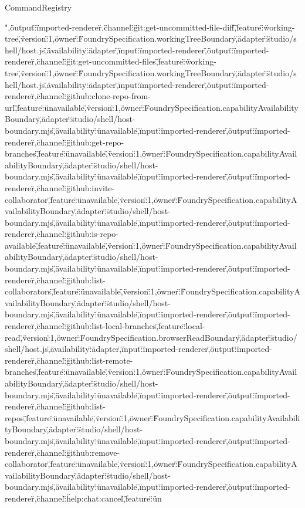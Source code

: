 \begin{lexlean}{CommandRegistry}
\begin{semanticmodule}
{",\"output\":\"imported-renderer\"},{\"channel\":\"git:get-uncommitted-file-diff\",\"feature\":\"working-tree\",\"version\":1,\"owner\":\"FoundrySpecification.workingTreeBoundary\",\"adapter\":\"studio/shell/host.js\",\"availability\":\"adapter\",\"input\":\"imported-renderer\",\"output\":\"imported-renderer\"},{\"channel\":\"git:get-uncommitted-files\",\"feature\":\"working-tree\",\"version\":1,\"owner\":\"FoundrySpecification.workingTreeBoundary\",\"adapter\":\"studio/shell/host.js\",\"availability\":\"adapter\",\"input\":\"imported-renderer\",\"output\":\"imported-renderer\"},{\"channel\":\"github:clone-repo-from-url\",\"feature\":\"unavailable\",\"version\":1,\"owner\":\"FoundrySpecification.capabilityAvailabilityBoundary\",\"adapter\":\"studio/shell/host-boundary.mjs\",\"availability\":\"unavailable\",\"input\":\"imported-renderer\",\"output\":\"imported-renderer\"},{\"channel\":\"github:get-repo-branches\",\"feature\":\"unavailable\",\"version\":1,\"owner\":\"FoundrySpecification.capabilityAvailabilityBoundary\",\"adapter\":\"studio/shell/host-boundary.mjs\",\"availability\":\"unavailable\",\"input\":\"imported-renderer\",\"output\":\"imported-renderer\"},{\"channel\":\"github:invite-collaborator\",\"feature\":\"unavailable\",\"version\":1,\"owner\":\"FoundrySpecification.capabilityAvailabilityBoundary\",\"adapter\":\"studio/shell/host-boundary.mjs\",\"availability\":\"unavailable\",\"input\":\"imported-renderer\",\"output\":\"imported-renderer\"},{\"channel\":\"github:is-repo-available\",\"feature\":\"unavailable\",\"version\":1,\"owner\":\"FoundrySpecification.capabilityAvailabilityBoundary\",\"adapter\":\"studio/shell/host-boundary.mjs\",\"availability\":\"unavailable\",\"input\":\"imported-renderer\",\"output\":\"imported-renderer\"},{\"channel\":\"github:list-collaborators\",\"feature\":\"unavailable\",\"version\":1,\"owner\":\"FoundrySpecification.capabilityAvailabilityBoundary\",\"adapter\":\"studio/shell/host-boundary.mjs\",\"availability\":\"unavailable\",\"input\":\"imported-renderer\",\"output\":\"imported-renderer\"},{\"channel\":\"github:list-local-branches\",\"feature\":\"local-read\",\"version\":1,\"owner\":\"FoundrySpecification.browserReadBoundary\",\"adapter\":\"studio/shell/host.js\",\"availability\":\"adapter\",\"input\":\"imported-renderer\",\"output\":\"imported-renderer\"},{\"channel\":\"github:list-remote-branches\",\"feature\":\"unavailable\",\"version\":1,\"owner\":\"FoundrySpecification.capabilityAvailabilityBoundary\",\"adapter\":\"studio/shell/host-boundary.mjs\",\"availability\":\"unavailable\",\"input\":\"imported-renderer\",\"output\":\"imported-renderer\"},{\"channel\":\"github:list-repos\",\"feature\":\"unavailable\",\"version\":1,\"owner\":\"FoundrySpecification.capabilityAvailabilityBoundary\",\"adapter\":\"studio/shell/host-boundary.mjs\",\"availability\":\"unavailable\",\"input\":\"imported-renderer\",\"output\":\"imported-renderer\"},{\"channel\":\"github:remove-collaborator\",\"feature\":\"unavailable\",\"version\":1,\"owner\":\"FoundrySpecification.capabilityAvailabilityBoundary\",\"adapter\":\"studio/shell/host-boundary.mjs\",\"availability\":\"unavailable\",\"input\":\"imported-renderer\",\"output\":\"imported-renderer\"},{\"channel\":\"help:chat:cancel\",\"feature\":\"un}
\end{semanticmodule}
\end{lexlean}
